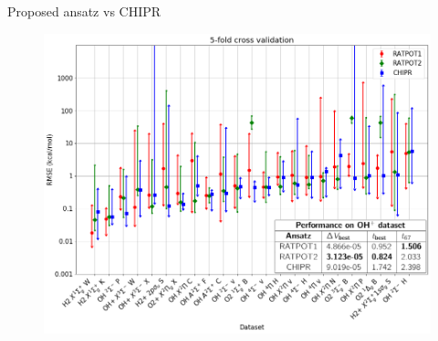 \documentclass{beamer}
\begin{document}
%

\begin{frame}{Proposed ansatz vs CHIPR}
    \begin{figure}
        \includegraphics[scale=0.38]{img/slide/performance_comparison_RATPOT1_RATPOT2_CHIPR_visu1.png}
        \label{fig:perform2}
    \end{figure}
\end{frame}
\end{document}
